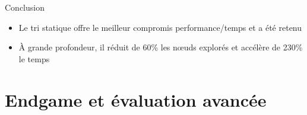 \documentclass{beamer}
\begin{document}
\begin{frame}
    \begin{block}{Conclusion}
    \scriptsize
    \begin{itemize}
        \item Le tri statique offre le meilleur compromis performance/temps et a été retenu
        \item À grande profondeur, il réduit de 60\% les nœuds explorés et accélère de 230\% le temps
    \end{itemize}
    \end{block}
\end{frame}

\section{Endgame et évaluation avancée}
\end{document}
